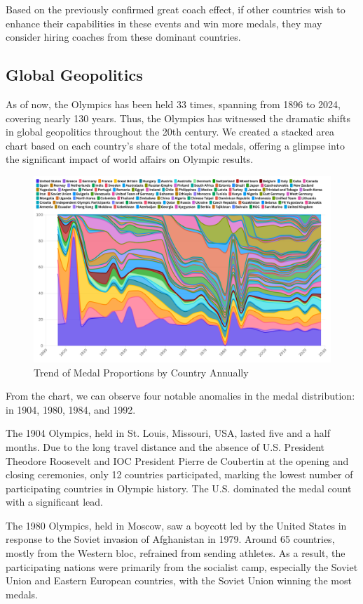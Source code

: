 \documentclass[12pt]{article}  %
\begin{document}
Based on the previously confirmed great coach effect, if other countries wish to enhance their capabilities in these events and win more medals, they may consider hiring coaches from these dominant countries.



\subsection{Global Geopolitics}
As of now, the Olympics has been held 33 times, spanning from 1896 to 2024, covering nearly 130 years. Thus, the Olympics has witnessed the dramatic shifts in global geopolitics throughout the 20th century. We created a stacked area chart based on each country's share of the total medals, offering a glimpse into the significant impact of world affairs on Olympic results.

\begin{figure}[H]
	\centering
	\includegraphics[width=16cm]{img/3.3-1.png}
	\caption{Trend of Medal Proportions by Country Annually}
	\label{fig:aa}
\end{figure}

From the chart, we can observe four notable anomalies in the medal distribution: in 1904, 1980, 1984, and 1992.

The 1904 Olympics, held in St. Louis, Missouri, USA, lasted five and a half months. Due to the long travel distance and the absence of U.S. President Theodore Roosevelt and IOC President Pierre de Coubertin at the opening and closing ceremonies, only 12 countries participated, marking the lowest number of participating countries in Olympic history. The U.S. dominated the medal count with a significant lead.

The 1980 Olympics, held in Moscow, saw a boycott led by the United States in response to the Soviet invasion of Afghanistan in 1979. Around 65 countries, mostly from the Western bloc, refrained from sending athletes. As a result, the participating nations were primarily from the socialist camp, especially the Soviet Union and Eastern European countries, with the Soviet Union winning the most medals.
\end{document}
